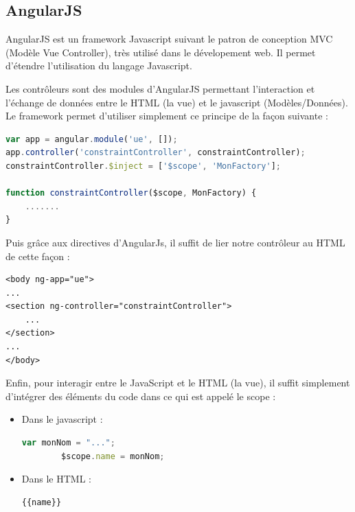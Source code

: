 \documentclass[12pt,a4paper,openany]{memoir}
\begin{document}
\subsection{AngularJS}
AngularJS est un framework Javascript suivant le patron de conception MVC (Modèle Vue Controller), très utilisé dans le dévelopement web. Il permet d'étendre l'utilisation du langage Javascript.
\par
Les contrôleurs sont des modules d'AngularJS permettant l'interaction et l'échange de données entre le HTML (la vue) et le javascript (Modèles/Données). Le framework permet d'utiliser simplement ce principe de la façon suivante :
\begin{lstlisting}[language=JavaScript]
var app = angular.module('ue', []);
app.controller('constraintController', constraintController);
constraintController.$inject = ['$scope', 'MonFactory'];

function constraintController($scope, MonFactory) {
	.......
}

\end{lstlisting}
\par
Puis grâce aux directives d'AngularJs, il suffit de lier notre contrôleur au HTML de cette façon :
\begin{lstlisting}
<body ng-app="ue">
...
<section ng-controller="constraintController">
    ...
</section>
...
</body>
\end{lstlisting}
\par 
Enfin, pour interagir entre le JavaScript et le HTML (la vue), il suffit simplement d'intégrer des éléments du code dans ce qui est appelé le scope :
\begin{itemize}
    \item Dans le javascript :
     \begin{lstlisting}[language=JavaScript]
        var monNom = "...";
        $scope.name = monNom;
    \end{lstlisting}
    \item Dans le HTML :
    \begin{lstlisting}[language=JavaScript]
        {{name}}
    \end{lstlisting}
\end{itemize}
\end{document}
